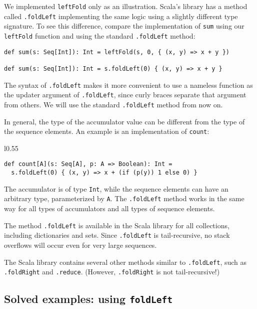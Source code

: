 We implemented \lstinline!leftFold! only as an illustration. Scala's
library has a method called \lstinline!.foldLeft! implementing the
same logic using a slightly different type signature. To see this
difference, compare the implementation of \lstinline!sum! using our
\lstinline!leftFold! function and using the standard \lstinline!.foldLeft!
method:
\begin{lstlisting}
def sum(s: Seq[Int]): Int = leftFold(s, 0, { (x, y) => x + y })

def sum(s: Seq[Int]): Int = s.foldLeft(0) { (x, y) => x + y }
\end{lstlisting}
The syntax of \lstinline!.foldLeft! makes it more convenient to use
a nameless function as the updater argument of \lstinline!.foldLeft!,
since curly braces separate that argument from others. We will use
the standard \lstinline!.foldLeft! method from now on.

In general, the type of the accumulator value can be different from
the type of the sequence elements. An example is an implementation
of \lstinline!count!:

\begin{wrapfigure}{l}{0.55\columnwidth}%
\vspace{-0.75\baselineskip}
\begin{lstlisting}
def count[A](s: Seq[A], p: A => Boolean): Int =
  s.foldLeft(0) { (x, y) => x + (if (p(y)) 1 else 0) }
\end{lstlisting}

\vspace{-0.9\baselineskip}
\end{wrapfigure}%

\noindent The accumulator is of type \lstinline!Int!, while the sequence
elements can have an arbitrary type, parameterized by \lstinline!A!.
The \lstinline!.foldLeft! method works in the same way for all types
of accumulators and all types of sequence elements.

The method \lstinline!.foldLeft! is available in the Scala library
for all collections, including dictionaries and sets. Since \lstinline!.foldLeft!
is tail-recursive, no stack overflows will occur even for very large
sequences.

The Scala library contains several other methods similar to \lstinline!.foldLeft!,
such as \lstinline!.foldRight! and \lstinline!.reduce!. (However,
\lstinline!.foldRight! is not tail-recursive!)

\subsection{Solved examples: using \texttt{foldLeft}}

